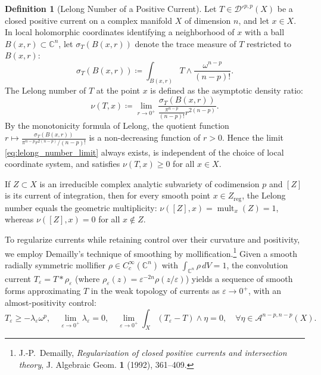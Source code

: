 \documentclass[11pt,a4paper]{article}
\theoremstyle{definition}
\newtheorem{definition}{Definition}[section]
\theoremstyle{plain}
\begin{document}
\begin{definition}[Lelong Number of a Positive Current]
\label{def:lelong_number}
Let $T \in \mathcal{D}'^{p,p}(X)$ be a closed positive current on a complex manifold $X$ of dimension $n$, and let $x \in X$. In local holomorphic coordinates identifying a neighborhood of $x$ with a ball $B(x, r) \subset \mathbb{C}^n$, let $\sigma_T(B(x, r))$ denote the trace measure of $T$ restricted to $B(x, r)$:
\begin{equation}
    \label{eq:trace_measure_def}
    \sigma_T(B(x, r)) \coloneqq \int_{B(x, r)} T \wedge \frac{\omega^{n-p}}{(n-p)!}.
\end{equation}
The Lelong number of $T$ at the point $x$ is defined as the asymptotic density ratio:
\begin{equation}
    \label{eq:lelong_number_limit}
    \nu(T, x) \coloneqq \lim_{r \to 0^+} \frac{\sigma_T(B(x, r))}{\frac{\pi^{n-p}}{(n-p)!} r^{2(n-p)}}.
\end{equation}
By the monotonicity formula of Lelong, the quotient function $r \mapsto \frac{\sigma_T(B(x, r))}{\pi^{n-p} r^{2(n-p)} / (n-p)!}$ is a non-decreasing function of $r > 0$. Hence the limit \eqref{eq:lelong_number_limit} always exists, is independent of the choice of local coordinate system, and satisfies $\nu(T, x) \ge 0$ for all $x \in X$.
\end{definition}

If $Z \subset X$ is an irreducible complex analytic subvariety of codimension $p$ and $[Z]$ is its current of integration, then for every smooth point $x \in Z_{\mathrm{reg}}$, the Lelong number equals the geometric multiplicity: $\nu([Z], x) = \operatorname{mult}_x(Z) = 1$, whereas $\nu([Z], x) = 0$ for all $x \notin Z$.

To regularize currents while retaining control over their curvature and positivity, we employ Demailly's technique of smoothing by mollification.\footnote{J.-P.~Demailly, \emph{Regularization of closed positive currents and intersection theory}, J. Algebraic Geom. \textbf{1} (1992), 361--409.} Given a smooth radially symmetric mollifier $\rho \in C_c^\infty(\mathbb{C}^n)$ with $\int_{\mathbb{C}^n} \rho \, dV = 1$, the convolution current $T_\varepsilon = T * \rho_\varepsilon$ (where $\rho_\varepsilon(z) = \varepsilon^{-2n}\rho(z/\varepsilon)$) yields a sequence of smooth forms approximating $T$ in the weak topology of currents as $\varepsilon \to 0^+$, with an almost-positivity control:
\begin{equation}
    \label{eq:demailly_mollification_control}
    T_\varepsilon \ge -\lambda_\varepsilon \omega^p, \quad \lim_{\varepsilon \to 0^+} \lambda_\varepsilon = 0, \quad \lim_{\varepsilon \to 0^+} \int_X (T_\varepsilon - T) \wedge \eta = 0, \quad \forall \eta \in \mathcal{A}^{n-p, n-p}(X).
\end{equation}
\end{document}

